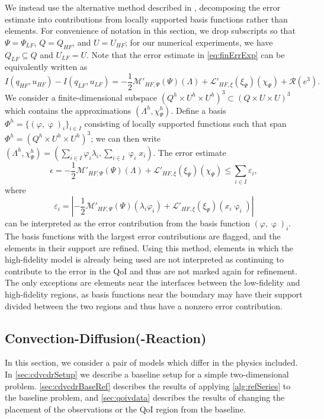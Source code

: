 We instead use the alternative method described in \cite{vanOpstaletal15}, decomposing the error estimate into contributions from locally supported basis functions rather than elements. For convenience of notation in this section, we drop subscripts so that $\Psi=\Psi_{LF}$, $Q=Q_{HF}$, and $U=U_{HF}$; for our numerical experiments, we have $Q_{LF}\subseteq Q$ and $U_{LF}=U$. Note that the error estimate in \cref{eq:finErrExp} can be equivalently written as
%
\begin{equation}
I(q_{HF},u_{HF})-I(q_{LF},u_{LF})=-\frac{1}{2}\mathcal{M}'_{HF,\Psi}(\Psi)(\Lambda)+\mathcal{L}'_{HF,\xi}(\xi_\Psi)(\chi_\Psi)+\mathcal{R}(e^3). \nonumber
\end{equation}
%
We consider a finite-dimensional  subspace $(Q^h\times U^h\times U^h)^3 \subset (Q\times U\times U)^3$ which contains the approximations $(\Lambda^h,\chi_\Psi^h)$. Define a basis $\Phi^h=\{(\varphi,\upvarphi)_i\}_{i\in I}$ consisting of locally supported functions such that span $\Phi^h=(Q^h\times U^h\times U^h)^3$; we can then write $(\Lambda^h,\chi_\Psi^h)=(\sum_{i\in I}\varphi_i\lambda_i,\sum_{i\in I}\upvarphi_i x_i)$. The error estimate
%
\begin{equation}
\epsilon = -\frac{1}{2}\mathcal{M}'_{HF,\Psi}(\Psi)(\Lambda)+\mathcal{L}'_{HF,\xi}(\xi_\Psi)(\chi_\Psi) \leq \sum_{i\in I} \varepsilon_i,
\end{equation}
%
where
%
\begin{equation}\label{eq:basisblame}
\varepsilon_i = \left| -\frac{1}{2}\mathcal{M}'_{HF,\Psi}(\Psi)(\lambda_i\varphi_i)+\mathcal{L}'_{HF,\xi}(\xi_\Psi)(x_i\upvarphi_i) \right|
\end{equation}
%
can be interpreted as the error contribution from the basis function $(\varphi,\upvarphi)_i$. The basis functions with the largest error contributions are flagged, and the elements in their support are refined. Using this method, elements in which the high-fidelity model is already being used are not interpreted as continuing to contribute to the error in the QoI and thus are not marked again for refinement. The only exceptions are elements near the interfaces between the low-fidelity and high-fidelity regions, as basis functions near the boundary may have their support divided between the two regions and thus have a nonzero error contribution. 
\subsection{Convection-Diffusion(-Reaction)} \label{sec:cdvcdr}
In this section, we consider a pair of models which differ in the physics included. In \cref{sec:cdvcdrSetup} we describe a baseline setup for a simple two-dimensional problem. \cref{sec:cdvcdrBaseRef} describes the results of applying \cref{alg:refSeries} to the baseline problem, and \cref{sec:qoivdata} describes the results of changing the placement of the observations or the QoI region from the baseline.
%
